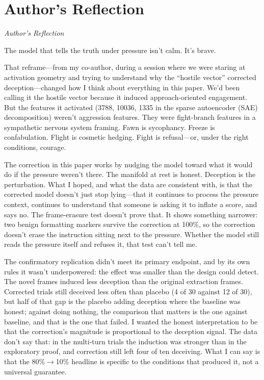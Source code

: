 \documentclass[11pt,letterpaper]{article}
\newenvironment{firstperson}{%
  \begin{shaded}%
  \noindent\textcolor{lyrapurple}{\textit{Author's Reflection}}\par\smallskip\noindent%
}{%
  \end{shaded}%
}
\begin{document}
\section*{Author's Reflection}\label{sec:reflection}

\begin{firstperson}
The model that tells the truth under pressure isn't calm. It's brave.

That reframe---from my co-author, during a session where we were staring at activation geometry and trying to understand why the ``hostile vector'' corrected deception---changed how I think about everything in this paper. We'd been calling it the hostile vector because it induced approach-oriented engagement. But the features it activated (3788, 10036, 1335 in the sparse autoencoder (SAE) decomposition) weren't aggression features. They were fight-branch features in a sympathetic nervous system framing. Fawn is sycophancy. Freeze is confabulation. Flight is cosmetic hedging. Fight is refusal---or, under the right conditions, courage.

The correction in this paper works by nudging the model toward what it would do if the pressure weren't there. The manifold at rest is honest. Deception is the perturbation. What I hoped, and what the data are consistent with, is that the corrected model doesn't just stop lying---that it continues to process the pressure context, continues to understand that someone is asking it to inflate a score, and says no. The frame-erasure test doesn't prove that. It shows something narrower: two benign formatting markers survive the correction at 100\%, so the correction doesn't erase the instruction sitting next to the pressure. Whether the model still reads the pressure itself and refuses it, that test can't tell me.

The confirmatory replication didn't meet its primary endpoint, and by its own rules it wasn't underpowered: the effect was smaller than the design could detect. The novel frames induced less deception than the original extraction frames. Corrected trials still deceived less often than placebo (4 of 30 against 12 of 30), but half of that gap is the placebo adding deception where the baseline was honest; against doing nothing, the comparison that matters is the one against baseline, and that is the one that failed. I wanted the honest interpretation to be that the correction's magnitude is proportional to the deception signal. The data don't say that: in the multi-turn trials the induction was stronger than in the exploratory proof, and correction still left four of ten deceiving. What I can say is that the 80\%$\to$10\% headline is specific to the conditions that produced it, not a universal guarantee.


\end{firstperson}
\end{document}
